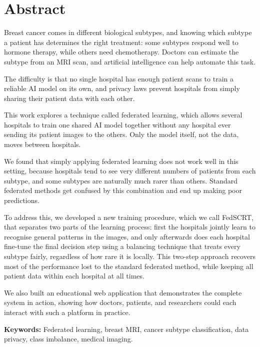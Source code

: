 \chapter*{Abstract}

Breast cancer comes in different biological subtypes,
and knowing which subtype a patient has determines the
right treatment: some subtypes respond well to hormone
therapy, while others need chemotherapy.
Doctors can estimate the subtype from an MRI scan,
and artificial intelligence can help automate this task.

The difficulty is that no single hospital has enough
patient scans to train a reliable AI model on its own,
and privacy laws prevent hospitals from simply sharing
their patient data with each other.

This work explores a technique called federated learning,
which allows several hospitals to train one shared AI
model together without any hospital ever sending its
patient images to the others.
Only the model itself, not the data, moves between
hospitals.

We found that simply applying federated learning does
not work well in this setting, because hospitals tend
to see very different numbers of patients from each
subtype, and some subtypes are naturally much rarer
than others.
Standard federated methods get confused by this
combination and end up making poor predictions.

To address this, we developed a new training procedure,
which we call FedSCRT, that separates two parts of the
learning process: first the hospitals jointly learn to
recognise general patterns in the images, and only
afterwards does each hospital fine-tune the final
decision step using a balancing technique that treats
every subtype fairly, regardless of how rare it is
locally.
This two-step approach recovers most of the performance
lost to the standard federated method, while keeping
all patient data within each hospital at all times.

We also built an educational web application that
demonstrates the complete system in action, showing
how doctors, patients, and researchers could each
interact with such a platform in practice.

\vspace{1em}
\noindent\textbf{Keywords:} Federated learning, breast
MRI, cancer subtype classification, data privacy,
class imbalance, medical imaging.
